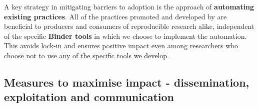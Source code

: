 A key strategy in mitigating barriers to adoption is the approach of \textbf{automating existing practices}.
All of the practices promoted and developed by \TheProject are beneficial to
producers and consumers of reproducible research alike,
independent of the specific \textbf{Binder tools} in which we choose to implement the automation.
This avoids lock-in and ensures positive impact even among researchers who choose not to use any of the specific tools we develop.

\subsection{Measures to maximise impact - dissemination, exploitation and communication}


